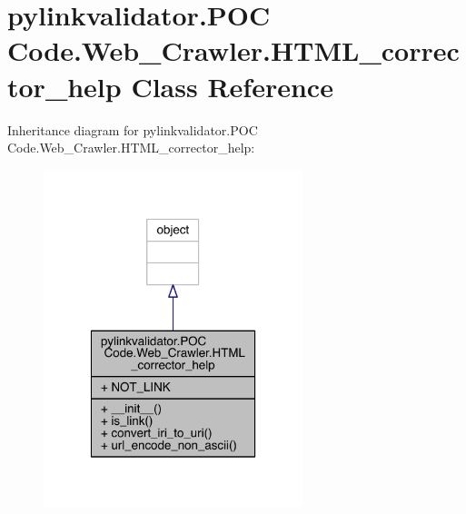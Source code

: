 \hypertarget{classpylinkvalidator_1_1_p_o_c_01_code_1_1_web___crawler_1_1_h_t_m_l__corrector__help}{}\section{pylinkvalidator.\+P\+OC Code.\+Web\+\_\+\+Crawler.\+H\+T\+M\+L\+\_\+corrector\+\_\+help Class Reference}
\label{classpylinkvalidator_1_1_p_o_c_01_code_1_1_web___crawler_1_1_h_t_m_l__corrector__help}


Inheritance diagram for pylinkvalidator.\+P\+OC Code.\+Web\+\_\+\+Crawler.\+H\+T\+M\+L\+\_\+corrector\+\_\+help\+:
\nopagebreak
\begin{figure}[H]
\begin{center}
\leavevmode
\includegraphics[width=214pt]{classpylinkvalidator_1_1_p_o_c_01_code_1_1_web___crawler_1_1_h_t_m_l__corrector__help__inherit__graph}
\end{center}
\end{figure}


